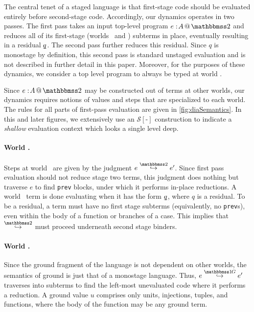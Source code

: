 
\begin{abstrsyn}
The central tenet of a staged language
is that first-stage code should be evaluated entirely before second-stage code.
Accordingly, our dynamics operates in two passes.
The first pass takes an input top-level program $\coltwo e A$
and reduces all of its first-stage (worlds \bbonem\ and \bbonep) subterms in place,
eventually resulting in a residual $\underline{\smash{q}}$.
The second pass further reduces this residual.
Since $q$ is monostage by definition, this second pass is standard unstaged evaluation
and is not described in further detail in this paper.
Moreover, for the purposes of these dynamics, we consider a top level program to always be typed at world \bbtwo.

Since $\coltwo e A$ may be constructed out of terms at other worlds, 
our dynamics requires notions of values and steps that are specialized to each world.
The rules for all parts of first-pass evaluation are given in \ref{fig:diaSemantics}.
In this and later figures, we extensively use an $\mathcal{S}[\text{-}]$ construction
to indicate a \emph{shallow} evaluation context which looks a single level deep.

\paragraph{World \bbtwo.} Steps at world \bbtwo\ are given by the judgment \mbox{$\steptwo e {e'}$}.
Since first pass evaluation should not reduce stage two terms, this judgment does nothing but traverse $e$ to find {\tt prev} blocks, under which it performs in-place reductions.
A world \bbtwo\ term is done evaluating when it has the form $\underline{\smash{q}}$, where $q$ is a residual. 
To be a residual, a term must have no first stage subterms (equivalently, no {\tt prev}s), even within the body of a function or branches of a case.
This implies that $\stepsym \bbtwo$ must proceed underneath second stage binders.

\paragraph{World \bbonep.} Since the ground fragment of the language is not dependent on other worlds, the semantics of ground is just that of a monostage language.
Thus, $\steppure e {e'}$ traverses into subterms to find the left-most unevaluated code where it performs a reduction. 
A ground value $u$ comprises only units, injections, tuples, and functions, where the body of the function may be any ground term.


\end{abstrsyn}
